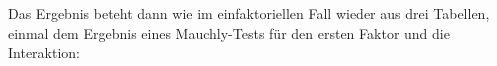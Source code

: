 \documentclass[
]{book}
\newenvironment{Shaded}{\begin{snugshade}}{\end{snugshade}}
\newcommand{\AttributeTok}[1]{\textcolor[rgb]{0.77,0.63,0.00}{#1}}
\newcommand{\NormalTok}[1]{#1}
\newcommand{\SpecialCharTok}[1]{\textcolor[rgb]{0.00,0.00,0.00}{#1}}
\newcommand{\StringTok}[1]{\textcolor[rgb]{0.31,0.60,0.02}{#1}}
\begin{document}
Das Ergebnis beteht dann wie im einfaktoriellen Fall wieder aus drei Tabellen, einmal dem Ergebnis eines Mauchly-Tests für den ersten Faktor und die Interaktion:

\begin{Shaded}
\end{Shaded}

 
  \providecommand{\huxb}[2]{\arrayrulecolor[RGB]{#1}\global\arrayrulewidth=#2pt}
  \providecommand{\huxvb}[2]{\color[RGB]{#1}\vrule width #2pt}
  \providecommand{\huxtpad}[1]{\rule{0pt}{#1}}
  \providecommand{\huxbpad}[1]{\rule[-#1]{0pt}{#1}}
\end{document}
